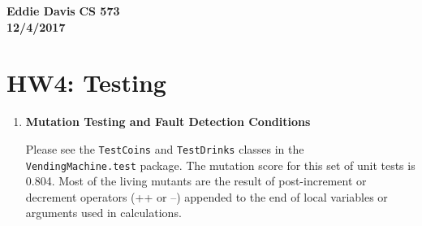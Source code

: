 \documentclass{report}
\begin{document}
\textbf{Eddie Davis}
\textbf{CS 573}\\
\textbf{12/4/2017}\\

\section*{HW4: Testing}

\begin{enumerate}
	\item \textbf{Mutation Testing and Fault Detection Conditions}

	Please see the \texttt{TestCoins} and \texttt{TestDrinks} classes in the
	\texttt{VendingMachine.test} package.
	The mutation score for this set of unit tests is 0.804.
	Most of the living mutants are the result of post-increment or decrement operators (++ or --) appended
	to the end of local variables or arguments used in calculations.


\end{enumerate}
\end{document}
